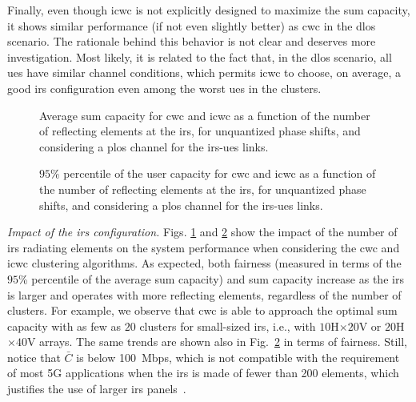 Finally, even though \gls{icwc} is not explicitly designed to maximize the sum capacity, it shows similar performance (if not even slightly better) as \gls{cwc} in the \gls{dlos} scenario.
The rationale behind this behavior is not clear and deserves more investigation. Most likely, it is related to the fact that, in the \gls{dlos} scenario, all \glspl{ue} have similar channel conditions, which permits \gls{icwc} to choose, on average, a good \gls{irs} configuration even among the worst \glspl{ue} in the clusters.

\begin{figure}[t]
    \centering
    \setlength{}
    \setlength{}
    
    \caption{Average sum capacity for \gls{cwc} and \gls{icwc} as a function of the number of reflecting elements at the \gls{irs}, for unquantized phase shifts, and considering a \gls{plos} channel for the \gls{irs}-\glspl{ue} links.}
    \label{fig:sumcap_vs_size}
\end{figure}

\begin{figure}[t]
    \centering
    \setlength{}
    \setlength{}
    
    \caption{$95$\% percentile of the user capacity for \gls{cwc} and \gls{icwc} as a function of the number of reflecting elements at the \gls{irs}, for unquantized phase shifts, and considering a \gls{plos} channel for the \gls{irs}-\glspl{ue} links.}%
    \label{fig:quantile_vs_size}
\end{figure}

\emph{Impact of the \gls{irs} configuration.}
Figs. \ref{fig:sumcap_vs_size} and \ref{fig:quantile_vs_size} show the impact of the number of \gls{irs} radiating elements on the system performance when considering the \gls{cwc} and \gls{icwc} clustering algorithms. 
As expected, both fairness (measured in terms of the $95$\% percentile of the average sum capacity) and sum capacity increase as the \gls{irs} is larger and operates with more reflecting elements, regardless of the number of clusters.
For example, we observe that \gls{cwc} is able to approach the optimal sum capacity with as few as $20$ clusters for small-sized \gls{irs}, i.e., with $10$H$\times20$V or $20$H$\times40$V arrays. The same trends are shown also in Fig.~\ref{fig:quantile_vs_size} in terms of fairness.
Still, notice that $\bar{C}$ is below 100~Mbps, which is not compatible with the requirement of most 5G applications when the \gls{irs} is made of fewer than 200 elements, which justifies the use of larger \gls{irs} panels~\cite{pagin2022end}. 

